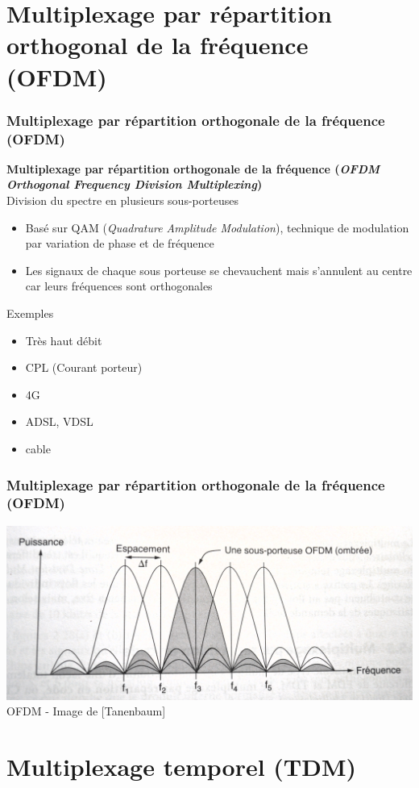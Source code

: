\section{Multiplexage par répartition orthogonal de la fréquence (OFDM)}

\begin{frame}[fragile]
  \frametitle{Multiplexage par répartition orthogonale de la fréquence (OFDM)}
{\large\bf Multiplexage par répartition orthogonale de la fréquence 
(\textit{OFDM Orthogonal Frequency Division Multiplexing})}\\
Division du spectre en plusieurs sous-porteuses
\begin{itemize}
	\item Basé sur QAM (\textit{Quadrature Amplitude Modulation}), technique de
	modulation par variation de phase et de fréquence
	\item Les signaux de chaque sous porteuse se chevauchent mais s'annulent au
	centre car leurs fréquences sont orthogonales
\end{itemize}
\vspace{.6cm}
Exemples 
\begin{itemize}
	\item Très haut débit
	\item CPL (Courant porteur)
	\item 4G
	\item ADSL, VDSL
	\item cable
\end{itemize}
\end{frame}

\begin{frame}[fragile]
  \frametitle{Multiplexage par répartition orthogonale de la fréquence (OFDM)}
\begin{center}
	\includegraphics[width=.8\linewidth]{img/2-26.png}\\
	{\scriptsize OFDM - Image de [Tanenbaum]}
\end{center}
\end{frame}


\section{Multiplexage temporel (TDM)}

